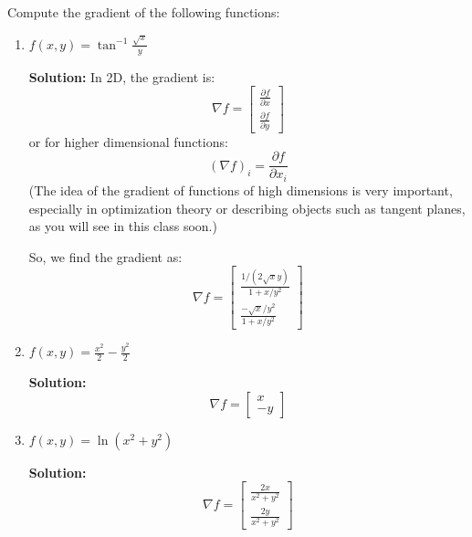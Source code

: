 \documentclass[letterpaper, 11pt]{article}
\begin{document}
\subsection{} Compute the gradient of the following functions:
\begin{enumerate}[label=(\alph*)]
\item $f(x,y) = \tan^{-1} \frac{\sqrt{x}}{y} $
\par \textbf{Solution:} In 2D, the gradient is:
\[ \nabla f = \left[ \begin{array}{c} \frac{\partial f}{\partial x} \\ \frac{ \partial f}{\partial y} \end{array} \right] \]
or for higher dimensional functions:
\[ (\nabla f)_i = \frac{\partial f}{\partial x_i} \]
(The idea of the gradient of functions of high dimensions is very important, especially in optimization theory or describing objects such as tangent planes, as you will see in this class soon.) 
\par So, we find the gradient as:
\[ \nabla f = \left[ \begin{array}{c} \frac{1/(2 \sqrt{x}y)}{1 + x/y^2} \\ \frac{-\sqrt{x}/y^2}{1 + x/y^2} \end{array} \right] \]


\item $f(x,y) = \frac{x^2}{2} - \frac{y^2}{2}$
\par \textbf{Solution:}
\[ \nabla f = \left[ \begin{array}{c} x \\ -y \end{array} \right] \]


\item $f(x,y) = \ln(x^2 + y^2) $
\par \textbf{Solution:}
\[ \nabla f = \left[ \begin{array}{c} \frac{2x}{x^2 + y^2} \\ \frac{2y}{x^2 + y^2} \end{array} \right] \]


\end{enumerate}

\end{document}
